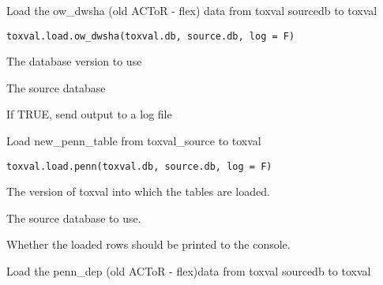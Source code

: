 \documentclass[letterpaper]{book}
\begin{document}
%
\begin{Description}\relax
Load the ow\_dwsha (old ACToR - flex) data  from toxval sourcedb to toxval
\end{Description}
%
\begin{Usage}
\begin{verbatim}
toxval.load.ow_dwsha(toxval.db, source.db, log = F)
\end{verbatim}
\end{Usage}
%
\begin{Arguments}
\begin{ldescription}
\item[\code{toxval.db}] The database version to use

\item[\code{source.db}] The source database

\item[\code{log}] If TRUE, send output to a log file
\end{ldescription}
\end{Arguments}
%
\begin{Description}\relax
Load new\_penn\_table from toxval\_source to toxval
\end{Description}
%
\begin{Usage}
\begin{verbatim}
toxval.load.penn(toxval.db, source.db, log = F)
\end{verbatim}
\end{Usage}
%
\begin{Arguments}
\begin{ldescription}
\item[\code{toxval.db}] The version of toxval into which the tables are loaded.

\item[\code{source.db}] The source database to use.

\item[\code{verbose}] Whether the loaded rows should be printed to the console.
\end{ldescription}
\end{Arguments}
%
\begin{Description}\relax
Load the penn\_dep (old ACToR - flex)data  from toxval sourcedb to toxval
\end{Description}
\end{document}
